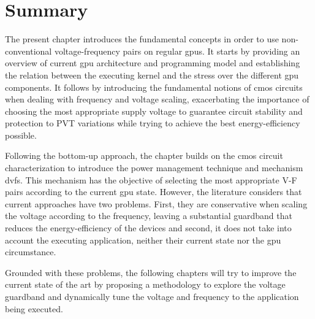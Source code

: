\section{Summary}

The present chapter introduces the fundamental concepts in order to use non-conventional voltage-frequency pairs on regular \acrshort{gpu}s. It starts by providing an overview of current \acrshort{gpu} architecture and programming model and establishing the relation between the executing kernel and the stress over the different \acrshort{gpu} components. It follows by introducing the fundamental notions of \acrshort{cmos} circuits when dealing with frequency and voltage scaling, exacerbating the importance of choosing the most appropriate supply voltage to guarantee circuit stability and protection to \acrshort{PVT} variations while trying to achieve the best energy-efficiency possible.

Following the bottom-up approach, the chapter builds on the \acrshort{cmos} circuit characterization to introduce the power management technique and mechanism \acrshort{dvfs}. This mechanism has the objective of selecting the most appropriate V-F pairs according to the current \acrshort{gpu} state. However, the literature considers that current approaches have two problems. First, they are conservative when scaling the voltage according to the frequency, leaving a substantial guardband that reduces the energy-efficiency of the devices and second, it does not take into account the executing application, neither their current state nor the \acrshort{gpu} circumstance.

Grounded with these problems, the following chapters will try to improve the current state of the art by proposing a methodology to explore the voltage guardband and dynamically tune the voltage and frequency to the application being executed.

